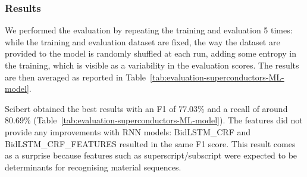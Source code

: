 \subsubsection{Results}
We performed the evaluation by repeating the training and evaluation 5 times: while the training and evaluation dataset are fixed, the way the dataset are provided to the model is randomly shuffled at each run, adding some entropy in the training, which is visible as a variability in the evaluation scores.
The results are then averaged as reported in Table~\ref{tab:evaluation-superconductors-ML-model}.

Scibert obtained the best results with an F1 of 77.03\% and a recall of around 80.69\% (Table~\ref{tab:evaluation-superconductors-ML-model}).
The features did not provide any improvements with RNN models: BidLSTM\_CRF and BidLSTM\_CRF\_FEATURES resulted in the same F1 score.
This result comes as a surprise because features such as superscript/subscript were expected to be determinants for recognising material sequences.


